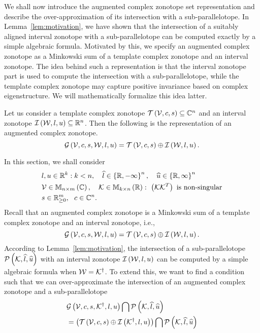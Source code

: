 We shall now introduce the augmented complex zonotope set
representation and describe the over-approximation of its intersection
with a sub-parallelotope.  In Lemma~\ref{lem:motivation}, we have shown that the
intersection of a suitably aligned interval zonotope with a
sub-parallelotope can be computed exactly by a simple algebraic
formula.  Motivated by this, we specify an augmented complex zonotope
as a Minkowski sum of a template complex zonotope and an interval
zonotope.  The idea behind such a representation is that the interval
zonotope part is used to compute the intersection with a
sub-parallelotope, while the template complex zonotope may capture
positive invariance based on complex eigenstructure.  We will
mathematically formalize this idea latter.
%
\begin{definition}
Let us consider a template complex zonotope
$\mathit{\operatorname{\mathcal{T}}}\left(\mathcal{V},c,s\right)\subseteq\mathbb{C}^n$ and an interval
zonotope $\mathit{\operatorname{\mathcal{I}}}\left(\mathcal{W},l,u\right)\subseteq\mathbb{R}^n$.  Then the
following is the representation of an augmented complex zonotope.
%
\[
\mathcal{G}\left(\mathcal{V},c,s,\mathcal{W},l,u\right)=\mathit{\operatorname{\mathcal{T}}}\left(\mathcal{V},c,s\right)\oplus \mathit{\operatorname{\mathcal{I}}}\left(\mathcal{W},l,u\right).
\]
%
\end{definition}
%
In this section, we shall consider
%
\begin{align*}
& l,u\in\mathbb{R}^k:
k<n,~~~\widehat{l}\in\left\{\mathbb{R},-\infty\right\}^n,~~~\widehat{u}\in\left\{\mathbb{R},\infty\right\}^n\\
& \mathcal{V}\in\mathbb{M}_{n\times m}\left(\mathbb{C}\right),~~~\mathcal{K}\in\mathbb{M}_{k\times n}\left(\mathbb{R}\right):~\left(\mathcal{K}\mathcal{K}^T\right)~\text{is
non-singular}\\
& s\in\mathbb{R}_{\geq 0}^m,~~c\in\mathbb{C}^n.      
\end{align*}
%
Recall that an augmented
complex zonotope is a Minkowski sum of a template complex zonotope and
an interval zonotope, i.e.,
%
\[
\mathcal{G}\left(\mathcal{V},c,s,\mathcal{W},l,u\right)=\mathit{\operatorname{\mathcal{T}}}\left(\mathcal{V},c,s\right)\oplus \mathit{\operatorname{\mathcal{I}}}\left(\mathcal{W},l,u\right).
\]
%
According to Lemma~\ref{lem:motivation}, the intersection of a
sub-parallelotope $\mathcal{P}\left(\mathcal{K},\widehat{l},\widehat{u}\right)$ with an interval
zonotope $\mathit{\operatorname{\mathcal{I}}}\left(\mathcal{W},l,u\right)$ can be computed by a simple
algebraic formula when $\mathcal{W}={\mathcal{K}}^\dagger$.  To extend this, we
want to find a condition such that we can over-approximate the
intersection of an augmented complex zonotope and a sub-parallelotope
%
\begin{align*}
& \mathcal{G}\left(\mathcal{V},c,s,{\mathcal{K}}^\dagger,l,u\right)\bigcap \mathcal{P}\left(\mathcal{K},\widehat{l},\widehat{u}\right)\\
& =\left(\mathit{\operatorname{\mathcal{T}}}\left(\mathcal{V},c,s\right)\oplus \mathit{\operatorname{\mathcal{I}}}\left({\mathcal{K}}^\dagger,l,u\right)\right)\bigcap \mathcal{P}\left(\mathcal{K},\widehat{l},\widehat{u}\right)
\end{align*}
